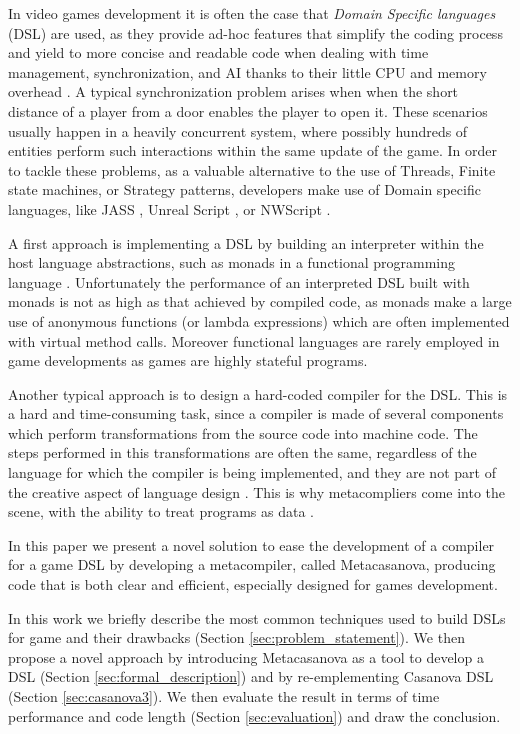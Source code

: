 In video games development it is often the case that  \textit{Domain
Specific languages} (DSL) are used, as they provide ad-hoc features
that simplify the coding process and yield to more concise and
readable code when dealing with  time management, synchronization, and
AI thanks to their little CPU and memory overhead
\cite{DSL_SURVEY_PAPER, GAME_SCRIPTING, CASANOVA2_PAPER} . A typical
synchronization problem arises when when the short distance of a player from a door enables
the player to open it. These scenarios usually happen in a heavily
concurrent system, where possibly hundreds of entities perform such
interactions within the same update of the game. In order to tackle
these problems, as a valuable alternative to the use of Threads,
Finite state machines, or Strategy patterns, developers make use of
Domain specific languages, like JASS \cite{JASS}, Unreal Script \cite{UNREAL_ENGINE},
or NWScript \cite{NW_SCRIPT}.

A first approach is implementing a DSL by
building an interpreter within the host language abstractions, such as
monads in a functional programming language \cite{DSL_MONAD_PAPER,
CASANOVA1_PAPER, SCRIPT_MONAD_PAPER}. Unfortunately the performance of
an interpreted DSL built with monads is not as high as that achieved
by compiled code, as monads make a large use of anonymous functions
(or lambda expressions) which are often implemented with virtual
method calls. Moreover functional languages are rarely employed in
game developments as games are highly stateful programs.

Another typical approach is to design a hard-coded compiler for the
DSL. This is a hard and time-consuming task, since a compiler is made
of several components which perform transformations from the source
code into machine code. The steps performed in this transformations
are often the same, regardless of the language for which the compiler
is being implemented, and they are not part of the creative aspect of
language design \cite{CWIC}. This is why metacompliers come into the
scene, with the ability to treat programs as data
\cite{GENERATIVE_PROGRAMMING_CZARNECKI}.

In this paper we present a novel solution to ease the development of a
compiler for a game DSL by developing a metacompiler, called Metacasanova, producing code
that is both clear and efficient, especially designed for games
development.

In this work we briefly describe the most common techniques used to build DSLs for game and their drawbacks (Section \ref{sec:problem_statement}). We then propose a novel approach by introducing Metacasanova as a tool to develop a DSL (Section \ref{sec:formal_description}) and by re-emplementing Casanova DSL (Section \ref{sec:casanova3}). We then evaluate the result in terms of time performance and code length (Section \ref{sec:evaluation}) and draw the conclusion.

